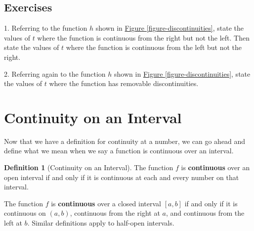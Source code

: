 \documentclass[12pt,]{book}
\newcommand{\terminology}[1]{\textbf{#1}}
\theoremstyle{plain}
\theoremstyle{definition}
\newtheorem{definition}[theorem]{Definition}
\numberwithin{equation}{section}
\newcommand{\cinterval}[2]{\left[#1,#2\right]}
\newcommand{\ointerval}[2]{\left(#1,#2\right)}
\begin{document}
\subsection[Exercises]{Exercises}\label{exercises-14}
\begin{exerciselist}
\item[1.]\hypertarget{exercise-111}{\null}Referring to the function \(h\) shown in \hyperref[figure-discontinuities]{Figure \ref{figure-discontinuities}}, state the values of \(t\) where the function is continuous from the right but not the left. Then state the values of \(t\) where the function is continuous from the left but not the right.%
\par\smallskip
\item[2.]\hypertarget{exercise-112}{\null}Referring again to the function \(h\) shown in \hyperref[figure-discontinuities]{Figure \ref{figure-discontinuities}}, state the values of \(t\) where the function has removable discontinuities.%
\par\smallskip
\end{exerciselist}
\typeout{************************************************}
\typeout{************************************************}
\section[Continuity on an Interval]{Continuity on an Interval}\label{section-continuity-on-an-interval}
Now that we have a definition for continuity at a number, we can go ahead and define what we mean when we say a function is continuous over an interval.%
\begin{definition}[Continuity on an Interval]\label{definition-continuity-on-an-interval}
The function \(f\) is \terminology{continuous} over an open interval if and only if it is continuous at each and every number on that interval.%
\par
The function \(f\) is \terminology{continuous} over a closed interval \(\cinterval{a}{b}\) if and only if it is continuous on \(\ointerval{a}{b}\), continuous from the right at \(a\), and continuous from the left at \(b\). Similar definitions apply to half-open intervals.%
\end{definition}
\typeout{************************************************}
\typeout{************************************************}
\end{document}
